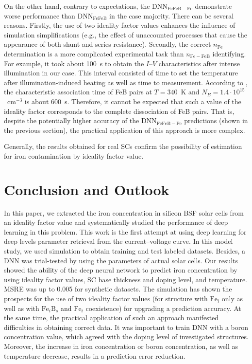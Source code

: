\documentclass[num-refs]{wiley-article} %
\begin{document}
On the other hand, contrary to expectations, the DNN$_\mathrm{FeFeB-Fe}$ demonstrate worse performance than DNN$_\mathrm{FeFeB}$ in the case majority.
There can be several reasons.
Firstly, the use of two ideality factor values enhances the influence of simulation simplifications (e.g., the effect of unaccounted processes that cause the appearance of both shunt and series resistance).
Secondly, the correct $n_\mathrm{Fe}$ determination is a more complicated experimental task than $n_\mathrm{Fe-FeB}$ identifying.
For example, it took about 100~s to obtain the $I$--$V$ characteristics
after intense illumination in our case.
This interval consisted of time to set the temperature after
illumination-induced heating
as well as time to measurement.
According to \cite{FeBAssJAP2014,FeBKin2019}, the characteristic association time of FeB pairs
at $T=340$~K and $N_B=1.4\cdot10^{15}$~cm$^{-3}$ is about 600~s.
Therefore, it cannot be expected that such a value of the ideality factor
corresponds to the complete dissociation of FeB pairs.
That is, despite the potentially higher accuracy of the DNN$_\mathrm{FeFeB-Fe}$ predictions
(shown in the previous section), the practical application of this approach is more complex.

Generally, the results obtained for real SCs confirm the possibility of estimation for iron contamination by ideality factor value.


\section{Conclusion and Outlook}
In this paper,
we extracted the iron concentration in silicon BSF solar cells from an
ideality factor value and systematically studied the performance
of deep learning in this problem.
This work  is the first attempt at using deep learning for deep levels parameter retrieval from the current--voltage curve.
In this model study, we used simulation to obtain training and test labeled datasets.
Besides, a DNN was trial-tested by using the parameters of actual solar cells.
Our results showed the ability of the deep neural network
to predict iron concentration by using ideality factor values,
SC base thickness and doping level, and temperature.
MSRE was up to 0.005 for synthetic datasets.
The simulation has shown the prospects for the use of two ideality factor values  (for structure with $\mathrm{Fe}_i$ only as well as with $\mathrm{Fe}_i\mathrm{B}_s$ and $\mathrm{Fe}_i$ coexistence)
for upgrading  a prediction accuracy.
At the same time, the practical application of such an approach manifested difficulties in obtaining correct data.
It was important to train DNN with a boron concentration value,
which agreed with the doping level of investigated structures.
Moreover, the increase in iron concentration or boron concentration, as well as temperature decrease,
results in a prediction error reduction.
\end{document}

